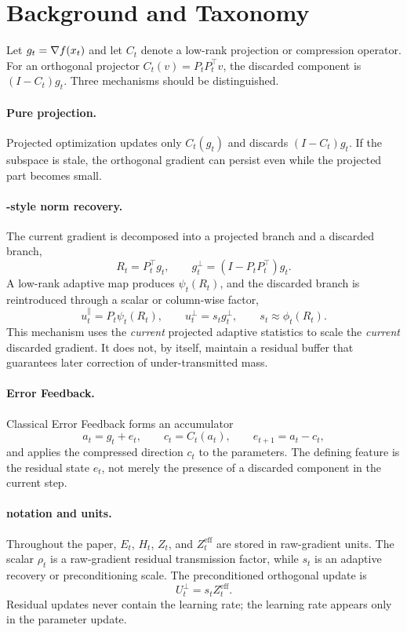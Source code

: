 \section{Background and Taxonomy}

Let $g_t=\nabla f(x_t)$ and let $C_t$ denote a low-rank projection or
compression operator. For an orthogonal projector $C_t(v)=P_tP_t^\top v$, the
discarded component is $(I-C_t)g_t$. Three mechanisms should be distinguished.

\paragraph{Pure projection.}
Projected optimization updates only $C_t(g_t)$ and discards
$(I-C_t)g_t$. If the subspace is stale, the orthogonal gradient can persist
even while the projected part becomes small.

\paragraph{\Fira-style norm recovery.}
The current gradient is decomposed into a projected branch and a discarded
branch,
\[
R_t=P_t^\top g_t,\qquad g_t^\perp=(I-P_tP_t^\top)g_t.
\]
A low-rank adaptive map produces $\psi_t(R_t)$, and the discarded branch is
reintroduced through a scalar or column-wise factor,
\[
u_t^\parallel = P_t \psi_t(R_t),\qquad
u_t^\perp = s_t g_t^\perp,\qquad
s_t \approx \phi_t(R_t).
\]
This mechanism uses the \emph{current} projected adaptive statistics to scale
the \emph{current} discarded gradient. It does not, by itself, maintain a
residual buffer that guarantees later correction of under-transmitted mass.

\paragraph{Error Feedback.}
Classical Error Feedback forms an accumulator
\[
a_t = g_t + e_t,\qquad c_t = C_t(a_t),\qquad e_{t+1}=a_t-c_t,
\]
and applies the compressed direction $c_t$ to the parameters. The defining
feature is the residual state $e_t$, not merely the presence of a discarded
component in the current step.

\paragraph{\BECR notation and units.}
Throughout the paper, $E_t$, $H_t$, $Z_t$, and $Z_t^{\mathrm{eff}}$ are stored
in raw-gradient units. The scalar $\rho_t$ is a raw-gradient residual
transmission factor, while $s_t$ is an adaptive recovery or preconditioning
scale. The preconditioned orthogonal update is
\[
U_t^\perp = s_t Z_t^{\mathrm{eff}}.
\]
Residual updates never contain the learning rate; the learning rate appears
only in the parameter update.
